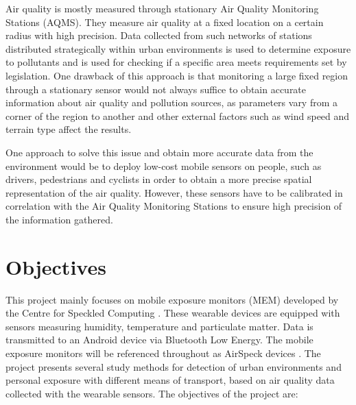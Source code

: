 \documentclass[bsc,frontabs,twoside,singlespacing, parskip,deptreport]{infthesis}     %
\begin{document}
Air quality is mostly measured through stationary Air Quality Monitoring Stations (AQMS). They measure air quality at a fixed location on a certain radius with high precision. Data collected from such networks of stations distributed strategically within urban environments is used to determine exposure to pollutants and is used for checking if a specific area meets requirements set by legislation. One drawback of this approach is that monitoring a large fixed region through a stationary sensor would not always suffice to obtain accurate information about air quality and pollution sources, as parameters vary from a corner of the region to another and other external factors such as wind speed and terrain type affect the results.

One approach to solve this issue and obtain more accurate data from the environment would be to deploy low-cost mobile sensors on people, such as drivers, pedestrians and cyclists in order to obtain a more precise spatial representation of the air quality. However, these sensors have to be calibrated in correlation with the Air Quality Monitoring Stations to ensure high precision of the information gathered.

\section{Objectives}

This project mainly focuses on mobile exposure monitors (MEM) developed by the 
Centre for Speckled Computing \cite{speckled-computing}. These wearable devices are equipped with sensors measuring humidity, temperature and particulate matter. Data is transmitted to an Android device via Bluetooth Low Energy. The mobile exposure monitors will be referenced throughout as AirSpeck devices \cite{airspeck}. The project presents several study methods for detection of urban environments and personal exposure with different means of transport, based on air quality data collected with the wearable sensors. The objectives of the project are:
\end{document}
